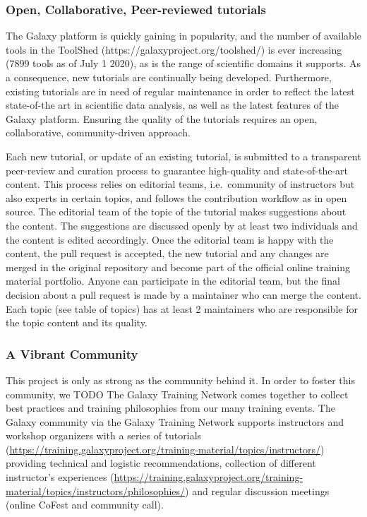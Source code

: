 \documentclass[10pt,letterpaper]{article}
\begin{document}
\subsubsection*{Open, Collaborative, Peer-reviewed tutorials}
The Galaxy platform is quickly gaining in popularity, and the number of available tools in the ToolShed (https://galaxyproject.org/toolshed/) is ever increasing (7899 tools as of July 1 2020), as is the range of scientific domains it supports. As a consequence, new tutorials are continually being developed. %
Furthermore, existing tutorials are in need of regular maintenance in order to reflect the latest state-of-the art in scientific data analysis, as well as the latest features of the Galaxy platform. Ensuring the quality of the tutorials requires an open, collaborative, community-driven approach.

Each new tutorial, or update of an existing tutorial, is submitted to a transparent peer-review and curation process to guarantee high-quality and state-of-the-art content.
This process relies on editorial teams, i.e.\ community of instructors but also experts in certain topics, and follows the contribution workflow as in open source.
The editorial team of the topic of the tutorial makes suggestions about the content.
The suggestions are discussed openly by at least two individuals and the content is edited accordingly.%
Once the editorial team is happy with the content, the pull request is accepted, the new tutorial and any changes are merged in the original repository and become part of the official online training material portfolio.
Anyone can participate in the editorial team, but the final decision about a pull request is made by a maintainer who can merge the content.
Each topic (see table of topics) has at least 2 maintainers who are responsible for the topic content and its quality.

\subsubsection*{A Vibrant Community}
This project is only as strong as the community behind it. In order to foster this community, we TODO
The Galaxy Training Network comes together to collect best practices and training philosophies from our many training events.%
The Galaxy community via the Galaxy Training Network supports instructors and workshop organizers with a series of tutorials (\url{https://training.galaxyproject.org/training-material/topics/instructors/}) providing technical and logistic recommendations, collection of different instructor’s experiences (\url{https://training.galaxyproject.org/training-material/topics/instructors/philosophies/}) and regular discussion meetings (online CoFest and community call).
\end{document}
